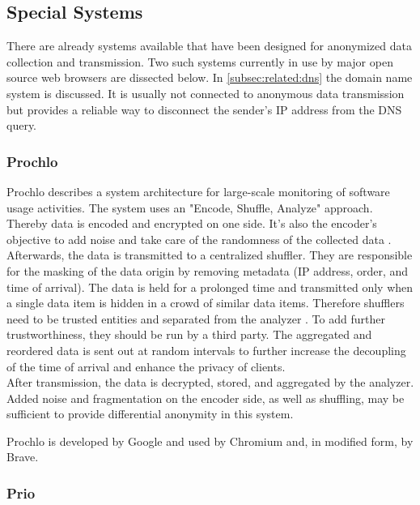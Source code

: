     \subsection{Special Systems}
        \label{subsec:related:special}
        There are already systems available that have been designed for anonymized data collection and transmission. 
        Two such systems currently in use by major open source web browsers are dissected below. In \ref{subsec:related:dns} the domain name system is discussed. It is usually not connected to anonymous data transmission but provides a reliable way to disconnect the sender's IP address from the DNS query.
        
    \subsubsection{Prochlo}
        Prochlo describes a system architecture for large-scale monitoring of software usage activities. The system uses an "Encode, Shuffle, Analyze" approach. Thereby data is encoded and encrypted on one side. It's also the encoder's objective to add noise and take care of the randomness of the collected data \cite{bittau_prochlo_2017}.\\
        Afterwards, the data is transmitted to a centralized shuffler. They are responsible for the masking of the data origin by removing metadata (IP address, order, and time of arrival).
        The data is held for a prolonged time and transmitted only when a single data item is hidden in a crowd of similar data items. Therefore shufflers need to be trusted entities and separated from the analyzer \cite{bittau_prochlo_2017}. To add further trustworthiness, they should be run by a third party. The aggregated and reordered data is sent out at random intervals to further increase the decoupling of the time of arrival and enhance the privacy of clients.\\
        After transmission, the data is decrypted, stored, and aggregated by the analyzer. 
        Added noise and fragmentation on the encoder side, as well as shuffling, may be sufficient to provide differential anonymity in this system.
        
        Prochlo is developed by Google and used by Chromium and, in modified form, by Brave.
    
    \subsubsection{Prio}

